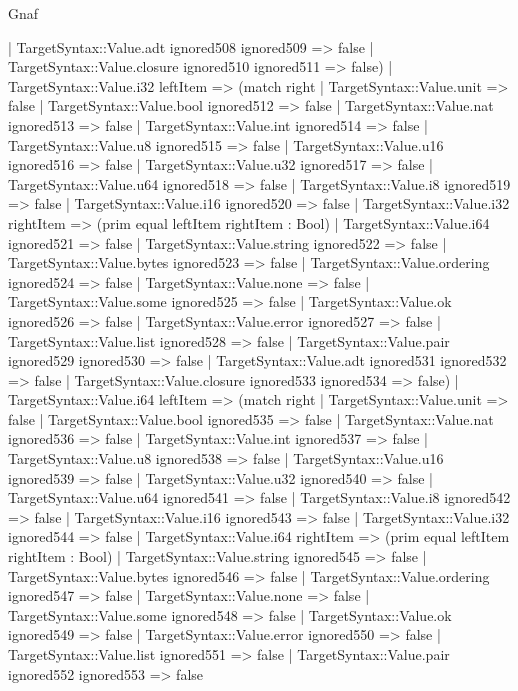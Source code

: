 \begin{lexlean}{Gnaf}
\begin{semanticmodule}
{      | TargetSyntax::Value.adt ignored508 ignored509 => false
      | TargetSyntax::Value.closure ignored510 ignored511 => false)
    | TargetSyntax::Value.i32 leftItem => (match right
      | TargetSyntax::Value.unit => false
      | TargetSyntax::Value.bool ignored512 => false
      | TargetSyntax::Value.nat ignored513 => false
      | TargetSyntax::Value.int ignored514 => false
      | TargetSyntax::Value.u8 ignored515 => false
      | TargetSyntax::Value.u16 ignored516 => false
      | TargetSyntax::Value.u32 ignored517 => false
      | TargetSyntax::Value.u64 ignored518 => false
      | TargetSyntax::Value.i8 ignored519 => false
      | TargetSyntax::Value.i16 ignored520 => false
      | TargetSyntax::Value.i32 rightItem => (prim equal leftItem rightItem : Bool)
      | TargetSyntax::Value.i64 ignored521 => false
      | TargetSyntax::Value.string ignored522 => false
      | TargetSyntax::Value.bytes ignored523 => false
      | TargetSyntax::Value.ordering ignored524 => false
      | TargetSyntax::Value.none => false
      | TargetSyntax::Value.some ignored525 => false
      | TargetSyntax::Value.ok ignored526 => false
      | TargetSyntax::Value.error ignored527 => false
      | TargetSyntax::Value.list ignored528 => false
      | TargetSyntax::Value.pair ignored529 ignored530 => false
      | TargetSyntax::Value.adt ignored531 ignored532 => false
      | TargetSyntax::Value.closure ignored533 ignored534 => false)
    | TargetSyntax::Value.i64 leftItem => (match right
      | TargetSyntax::Value.unit => false
      | TargetSyntax::Value.bool ignored535 => false
      | TargetSyntax::Value.nat ignored536 => false
      | TargetSyntax::Value.int ignored537 => false
      | TargetSyntax::Value.u8 ignored538 => false
      | TargetSyntax::Value.u16 ignored539 => false
      | TargetSyntax::Value.u32 ignored540 => false
      | TargetSyntax::Value.u64 ignored541 => false
      | TargetSyntax::Value.i8 ignored542 => false
      | TargetSyntax::Value.i16 ignored543 => false
      | TargetSyntax::Value.i32 ignored544 => false
      | TargetSyntax::Value.i64 rightItem => (prim equal leftItem rightItem : Bool)
      | TargetSyntax::Value.string ignored545 => false
      | TargetSyntax::Value.bytes ignored546 => false
      | TargetSyntax::Value.ordering ignored547 => false
      | TargetSyntax::Value.none => false
      | TargetSyntax::Value.some ignored548 => false
      | TargetSyntax::Value.ok ignored549 => false
      | TargetSyntax::Value.error ignored550 => false
      | TargetSyntax::Value.list ignored551 => false
      | TargetSyntax::Value.pair ignored552 ignored553 => false
}
\end{semanticmodule}
\end{lexlean}
